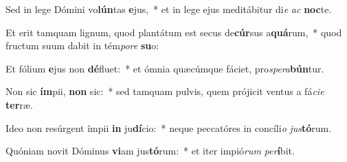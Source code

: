 \item Sed in lege Dómini vo\textbf{lún}tas \textbf{e}jus,~* et in lege ejus meditábitur di\textit{e} \textit{ac} \textbf{noc}te.
\item Et erit tamquam lignum, quod plantátum est secus de\textbf{cúr}sus a\textbf{quá}rum,~* quod fructum suum dabit in tém\textit{po}\textit{re} \textbf{su}o:
\item Et fólium \textbf{e}jus non \textbf{dé}fluet:~* et ómnia quæcúmque fáciet, pro\textit{spe}\textit{ra}\textbf{bún}tur.
\item Non sic \textbf{ím}pii, \textbf{non} sic:~* sed tamquam pulvis, quem prójicit ventus a fá\textit{ci}\textit{e} \textbf{ter}ræ.
\item Ideo non resúrgent ímpii \textbf{in} ju\textbf{dí}cio:~* neque peccatóres in concíli\textit{o} \textit{jus}\textbf{tó}rum.
\item Quóniam novit Dóminus \textbf{vi}am jus\textbf{tó}rum:~* et iter impió\textit{rum} \textit{per}\textbf{í}bit.
